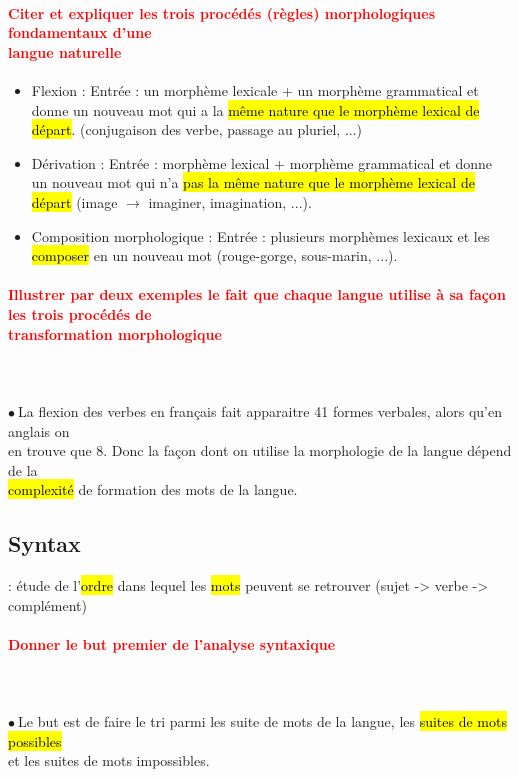 \documentclass[letterpaper, 12pt]{article}
\newcommand{\alinea}{
\hspace*{0.3cm}}
\newcommand{\red}[1]{
	\textcolor{red}{#1}
}
\newcommand{\myul}[1]{
	\underline{\smash{#1}}
}
\newcommand{\point}{$\bullet\ $}
\begin{document}
		\paragraph{\red{Citer et expliquer les trois procédés (règles) morphologiques fondamentaux d'une 
		~\\ \hspace*{0.035cm} langue naturelle}}
			\begin{itemize}
				\setlength{\itemsep}{0pt}		
				\setlength{\parskip}{0pt}		
				\setlength{\parsep}{0pt}	
				\item Flexion : Entrée : un morphème lexicale + un morphème grammatical et donne un nouveau mot 
					qui a la \hl{m\^eme nature que le morph\`eme lexical de d\'epart}. 
					(conjugaison des verbe, passage au pluriel, ...)
				\item Dérivation : Entrée : morphème lexical + morphème grammatical et donne un nouveau mot
					qui n'a \hl{pas la m\^eme nature que le morph\`eme lexical de d\'epart} 
					(image $\rightarrow$ imaginer, imagination, ...).
				\item Composition morphologique : Entrée : plusieurs morphèmes lexicaux et les \hl{composer} en
					un nouveau mot (rouge-gorge, sous-marin, ...).
			\end{itemize}
				
		\paragraph{\red{Illustrer par deux exemples le fait que chaque langue utilise à sa façon les trois procédés de 
		~\\ \hspace*{0.035cm} transformation morphologique}}~\\~\\
			\point La flexion des verbes en français fait apparaitre 41 formes verbales, alors qu'en anglais on  
			\\\alinea en trouve que 8. Donc la façon dont on utilise la morphologie de la langue dépend de la 
			\\\alinea \hl{complexit\'e} de formation des mots de la langue.
		
	\subsection{Syntax}
		\myul{Syntaxe}: \'etude de l'\hl{ordre} dans lequel les \hl{mots} peuvent se retrouver 
			(sujet -> verbe -> complément)
		\paragraph{\red{Donner le but premier de l'analyse syntaxique}}~\\~\\
			\point Le but est de faire le tri parmi les suite de mots de la langue, les \hl{suites de mots possibles}
				\\\alinea et les suites de mots impossibles.
		
\end{document}
